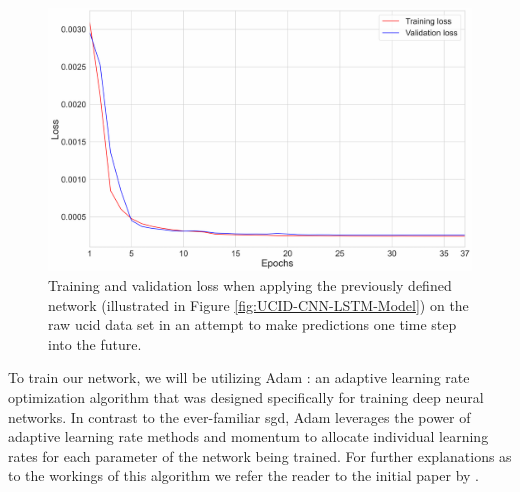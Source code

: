 \begin{adjustwidth}{-1.65cm}{-0.0cm}
\begin{enumerate}[label=Step 4.2.\arabic*:, leftmargin=*]
    \begin{figure}[H]
        \centering
        \includegraphics[width=\textwidth]{Images/Chapter 6/Stage 4/UCID/UCID-CNN-LSTM-Training-Validation-Loss.pdf}
        \caption{Training and validation loss when applying the previously defined network (illustrated in Figure \ref{fig:UCID-CNN-LSTM-Model}) on the raw \gls{ucid} data set in an attempt to make predictions one time step into the future.}
        \label{fig:UCID-CNN-LSTM-Training-Validation-Loss}
    \end{figure}
    
    \noindent \newline To train our network, we will be utilizing Adam \cite{Kingma}: an adaptive learning rate optimization algorithm that was designed specifically for training deep neural networks. In contrast to the ever-familiar \gls{sgd}, Adam leverages the power of adaptive learning rate methods and momentum to allocate individual learning rates for each parameter of the network being trained. For further explanations as to the workings of this algorithm we refer the reader to the initial paper by \citet{Kingma}.
    

\end{enumerate}
\end{adjustwidth}
